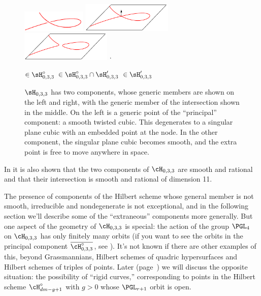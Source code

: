 \begin{figure}
\leavevmode
\vskip-0.05in\leavevmode
{}\hbox{\includegraphics[width=1.2in]{main/Fig18-1A-new}}\quad
\includegraphics[width=1.7in]{main/Fig18-1B-new}%
\includegraphics[width=1.7in]{main/Fig18-1C-new}%
\hskip-20pt\hbox{\Large{\color{red}$\cdot$}}\hskip20pt%

\centerline{\small$\in \sH^\circ_{0,3,3}$\hfil\hfil 
$\in \sH^\circ_{0,3,3}\cap \sH'_{0,3,3}$\hfil\hfil 
\quad$\in \sH'_{0,3,3}$\qquad}

\caption{$\sH_{0,3,3}$ has two components, whose generic members are
shown on the left and right,
with the generic member of the intersection shown in the middle. On
the left is
a generic point of the ``principal'' component: a
smooth
twisted cubic. This degenerates to a singular plane
cubic with an embedded point at the node. In the other component, the
singular plane cubic
becomes smooth, and the extra point is free to move anywhere in space.}
\label{Fig18.1}
\end{figure}

\begin{fact}
In \cite{Piene-Schlessinger} it is also shown that the two components
%
%
of $\cH_{0,3,3}$ are smooth and rational and that
their  intersection is  smooth and rational of dimension 11.
\end{fact}

The presence of components of the Hilbert scheme whose general member is
not smooth, irreducible and nondegenerate is not exceptional, and in the
following section we'll describe some of the ``extraneous'' components more
generally. But one aspect of the geometry of $\cH_{0,3,3}$ is special:
the action of the group 
$\PGL_4$
%
on $\cH_{0,3,3}$ has only finitely
many orbits (if you want to see the orbits in the
principal
component
$\overline{\cH^\circ_{0,3,3}}$, see \cite{Montreal}). It's not known if
there are other examples of this, beyond Grassmannians, Hilbert schemes
of quadric hypersurfaces and Hilbert schemes of triples of points.
Later (page~\pageref{rigid?})
we will discuss the opposite situation: the
%
possibility of ``rigid curves,''  corresponding to points in the Hilbert
%
scheme $\cH^{\circ}_{dm-g+1}$ with $g>0$ whose $\PGL_{r+1}$ orbit is open.

